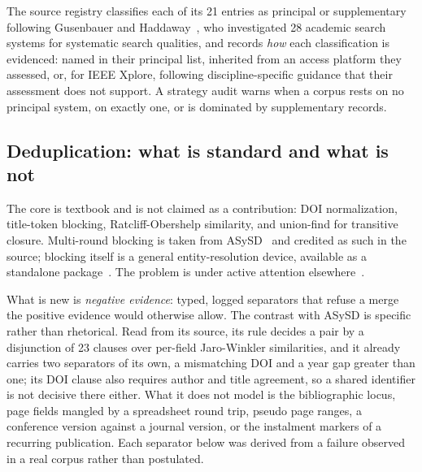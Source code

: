 \documentclass[final,5p,times,twocolumn]{elsarticle}
\begin{document}
The source registry classifies each of its 21 entries as principal or
supplementary following Gusenbauer and Haddaway~\cite{gusenbauer2020}, who
investigated 28 academic search systems for systematic search qualities, and
records \emph{how} each classification is evidenced: named in their principal
list, inherited from an access platform they assessed, or, for IEEE Xplore,
following discipline-specific guidance that their assessment does not support.
A strategy audit warns when a corpus rests on no principal system, on exactly
one, or is dominated by supplementary records.

\subsection{Deduplication: what is standard and what is not}
\label{sec:dedup}

The core is textbook and is not claimed as a contribution: DOI normalization,
title-token blocking, Ratcliff-Obershelp similarity, and union-find for
transitive closure. Multi-round blocking is taken from
ASySD~\cite{hair2023} and credited as such in the source; blocking itself is a
general entity-resolution device, available as a standalone
package~\cite{blockingpy2026}. The problem is under
active attention elsewhere~\cite{forbes2024}.

What is new is \emph{negative evidence}: typed, logged separators that refuse
a merge the positive evidence would otherwise allow. The contrast with ASySD is
specific rather than rhetorical. Read from its source, its rule decides a pair
by a disjunction of 23 clauses over per-field Jaro-Winkler similarities, and it
already carries two separators of its own, a mismatching DOI and a year gap
greater than one; its DOI clause also requires author and title agreement, so a
shared identifier is not decisive there either. What it does not model is the
bibliographic locus, page fields mangled by a spreadsheet round trip, pseudo
page ranges, a conference version against a journal version, or the instalment
markers of a recurring publication. Each separator below was derived from a
failure observed in a real corpus rather than postulated.
\end{document}
